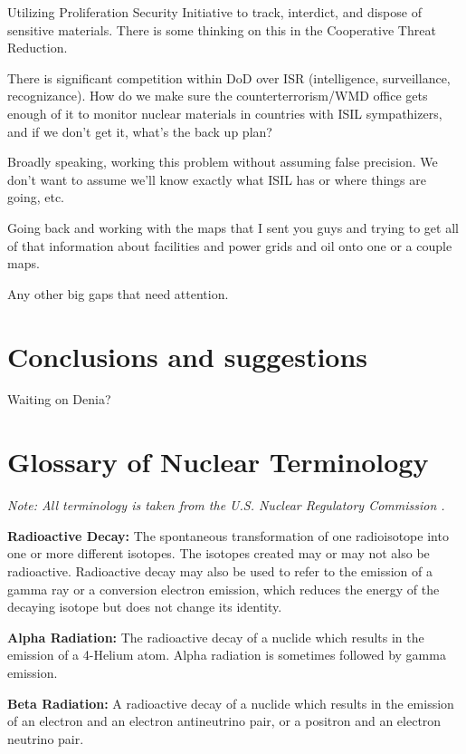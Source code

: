 \documentclass{report}
\begin{document}
Utilizing Proliferation Security Initiative to track, interdict, and dispose of sensitive materials. There is some thinking on this in the Cooperative Threat Reduction.

There is significant competition within DoD over ISR (intelligence, surveillance, recognizance). How do we make sure the counterterrorism/WMD office gets enough of it to monitor nuclear materials in countries with ISIL sympathizers, and if we don't get it, what's the back up plan?

Broadly speaking, working this problem without assuming false precision. We don't want to assume we'll know exactly what ISIL has or where things are going, etc.

Going back and working with the maps that I sent you guys and trying to get all of that information about facilities and power grids and oil onto one or a couple maps. 

Any other big gaps that need attention.



\chapter{Conclusions and suggestions }

Waiting on Denia?





\appendix
\chapter[Appendix A: Glossary of Nuclear Terminology]{Glossary of Nuclear Terminology}  \label{app:glossary}



\textit{Note: All terminology is taken from the U.S. Nuclear Regulatory Commission  \cite{USNRC2015}.}

\textbf{Radioactive Decay:} The spontaneous transformation of one radioisotope into one or more different isotopes. The isotopes created may or may not also be radioactive. Radioactive decay may also be used to refer to the emission of a gamma ray or a conversion electron emission, which reduces the energy of the decaying isotope but does not change its identity. 

\textbf{Alpha Radiation:} The radioactive decay of a nuclide which results in the emission of a 4-Helium atom. Alpha radiation is sometimes followed by gamma emission. 

\textbf{Beta Radiation:} A radioactive decay of a nuclide which results in the emission of an electron and an electron antineutrino pair, or a positron and an electron neutrino pair. 
\end{document}
